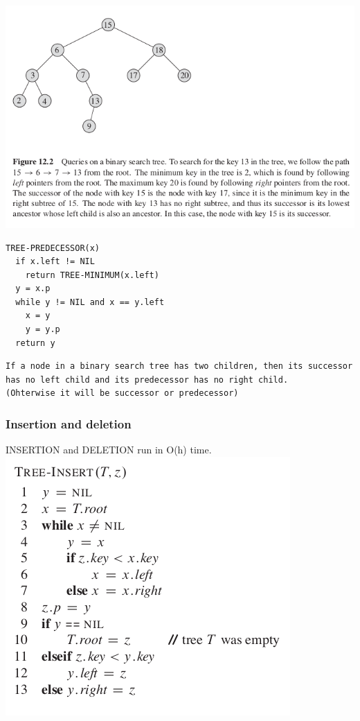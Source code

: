 \documentclass[11pt]{article}
\begin{document}
\includegraphics[width=.9\linewidth]{pics/c12_search_fig.png} \\

\begin{verbatim}
TREE-PREDECESSOR(x)
  if x.left != NIL
    return TREE-MINIMUM(x.left)
  y = x.p
  while y != NIL and x == y.left
    x = y
    y = y.p
  return y
\end{verbatim}

\begin{verbatim}
If a node in a binary search tree has two children, then its successor has no left child and its predecessor has no right child.
(Ohterwise it will be successor or predecessor)
\end{verbatim}

\subsubsection{Insertion and deletion}
\label{sec-4-3-3}
INSERTION and DELETION run in O(h) time. \\

\includegraphics[width=.9\linewidth]{pics/c12_tree_insert.png} \\
\end{document}
